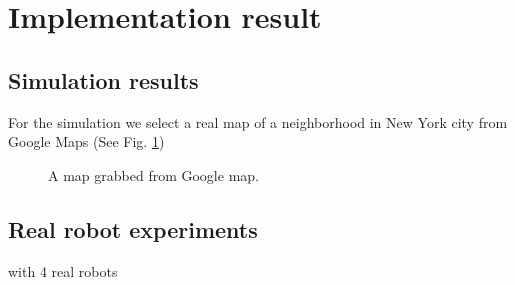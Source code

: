 \documentclass[letterpaper, 10 pt, conference]{ieeeconf}  %
\begin{document}

\section{Implementation result}
%
\subsection{Simulation results}
%
For the simulation we select a real map of a neighborhood in New York city from Google Maps (See Fig. \ref{fig:googlemap})
%
\begin{figure}[H]
	\centering	
	\caption{A map grabbed from Google map.}
	\label{fig:googlemap}
\end{figure}
%

\subsection{Real robot experiments}
%
with 4 real robots
\end{document}
